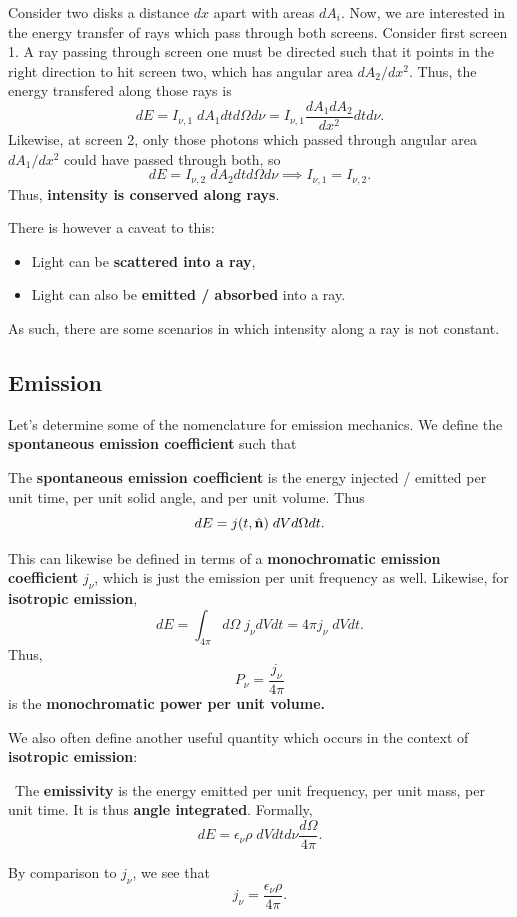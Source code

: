 Consider two disks a distance $dx$ apart with areas $dA_i$. Now, we are interested in the energy transfer of rays which pass through both screens. Consider first screen 1. A ray passing through screen one must be directed such that it points in the right direction to hit screen two, which has angular area $dA_2/dx^2$. Thus, the energy transfered along those rays is
\[
dE = I_{\nu,1} \;dA_1 dt d\Omega d\nu = I_{\nu,1} \frac{dA_1 dA_2}{dx^2} dt d\nu.
\]
Likewise, at screen 2, only those photons which passed through angular area $dA_1/dx^2$ could have passed through both, so
\[
dE = I_{\nu,2} \; dA_2 dt d\Omega d\nu \implies I_{\nu,1} = I_{\nu,2}.
\]
Thus, \textbf{intensity is conserved along rays}.
\par
There is however a caveat to this:

\begin{itemize}
    \item Light can be \textbf{scattered into a ray},
    \item Light can also be \textbf{emitted / absorbed} into a ray.
\end{itemize}

As such, there are some scenarios in which intensity along a ray is not constant.

\subsection{Emission}

Let's determine some of the nomenclature for emission mechanics. We define the \textbf{spontaneous emission coefficient} such that
\vspace{0.5cm}
\begin{definition}
\label{def:spont_emission_coef}
The \textbf{spontaneous emission coefficient} is the energy injected / emitted per unit time, per unit solid angle, and per unit volume. Thus
\[
dE = j(t,\hat{\bf n})\; dV d\Omega dt.
\]
\par
This can likewise be defined in terms of a \textbf{monochromatic emission coefficient} $j_\nu$, which is just the emission per unit frequency as well. Likewise, for \textbf{isotropic emission}, 
\[
dE = \int_{4\pi} d\Omega\; j_\nu dV dt = 4\pi j_\nu \; dV dt.
\]
Thus,
\[
P_\nu = \frac{j_\nu}{4\pi}
\]
is the \textbf{monochromatic power per unit volume.}
\end{definition}
\vspace{0.5cm}
We also often define another useful quantity which occurs in the context of \textbf{isotropic emission}:
\begin{definition}[Emissivity]
\
    The \textbf{emissivity} is the energy emitted per unit frequency, per unit mass, per unit time. It is thus \textbf{angle integrated}. Formally,
    \[
    dE = \epsilon_\nu \rho \; dV dt d\nu \frac{d\Omega}{4\pi}.
    \]
\end{definition}
\vspace{0.5cm}
By comparison to $j_\nu$, we see that 
\[
j_\nu = \frac{\epsilon_\nu \rho}{4\pi}.
\]
